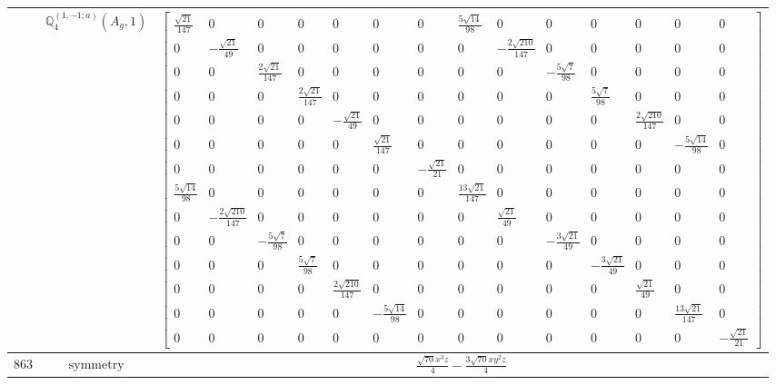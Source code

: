 \documentclass[fleqn,8pt,landscape]{jsarticle}
\begin{document}
\begin{longtable}{ccc}
$  $ & $ \mathbb{Q}_{4}^{(1,-1;a)}(A_{g},1) $ & $ \begin{bmatrix} \frac{\sqrt{21}}{147} & 0 & 0 & 0 & 0 & 0 & 0 & \frac{5 \sqrt{14}}{98} & 0 & 0 & 0 & 0 & 0 & 0 \\ 0 & - \frac{\sqrt{21}}{49} & 0 & 0 & 0 & 0 & 0 & 0 & - \frac{2 \sqrt{210}}{147} & 0 & 0 & 0 & 0 & 0 \\ 0 & 0 & \frac{2 \sqrt{21}}{147} & 0 & 0 & 0 & 0 & 0 & 0 & - \frac{5 \sqrt{7}}{98} & 0 & 0 & 0 & 0 \\ 0 & 0 & 0 & \frac{2 \sqrt{21}}{147} & 0 & 0 & 0 & 0 & 0 & 0 & \frac{5 \sqrt{7}}{98} & 0 & 0 & 0 \\ 0 & 0 & 0 & 0 & - \frac{\sqrt{21}}{49} & 0 & 0 & 0 & 0 & 0 & 0 & \frac{2 \sqrt{210}}{147} & 0 & 0 \\ 0 & 0 & 0 & 0 & 0 & \frac{\sqrt{21}}{147} & 0 & 0 & 0 & 0 & 0 & 0 & - \frac{5 \sqrt{14}}{98} & 0 \\ 0 & 0 & 0 & 0 & 0 & 0 & - \frac{\sqrt{21}}{21} & 0 & 0 & 0 & 0 & 0 & 0 & 0 \\ \frac{5 \sqrt{14}}{98} & 0 & 0 & 0 & 0 & 0 & 0 & \frac{13 \sqrt{21}}{147} & 0 & 0 & 0 & 0 & 0 & 0 \\ 0 & - \frac{2 \sqrt{210}}{147} & 0 & 0 & 0 & 0 & 0 & 0 & \frac{\sqrt{21}}{49} & 0 & 0 & 0 & 0 & 0 \\ 0 & 0 & - \frac{5 \sqrt{7}}{98} & 0 & 0 & 0 & 0 & 0 & 0 & - \frac{3 \sqrt{21}}{49} & 0 & 0 & 0 & 0 \\ 0 & 0 & 0 & \frac{5 \sqrt{7}}{98} & 0 & 0 & 0 & 0 & 0 & 0 & - \frac{3 \sqrt{21}}{49} & 0 & 0 & 0 \\ 0 & 0 & 0 & 0 & \frac{2 \sqrt{210}}{147} & 0 & 0 & 0 & 0 & 0 & 0 & \frac{\sqrt{21}}{49} & 0 & 0 \\ 0 & 0 & 0 & 0 & 0 & - \frac{5 \sqrt{14}}{98} & 0 & 0 & 0 & 0 & 0 & 0 & \frac{13 \sqrt{21}}{147} & 0 \\ 0 & 0 & 0 & 0 & 0 & 0 & 0 & 0 & 0 & 0 & 0 & 0 & 0 & - \frac{\sqrt{21}}{21} \end{bmatrix} $ \\ \hline
$ 863 $ & $ \text{symmetry} $ & $ \frac{\sqrt{70} x^{3} z}{4} - \frac{3 \sqrt{70} x y^{2} z}{4} $ \\

\end{longtable}
\end{document}
